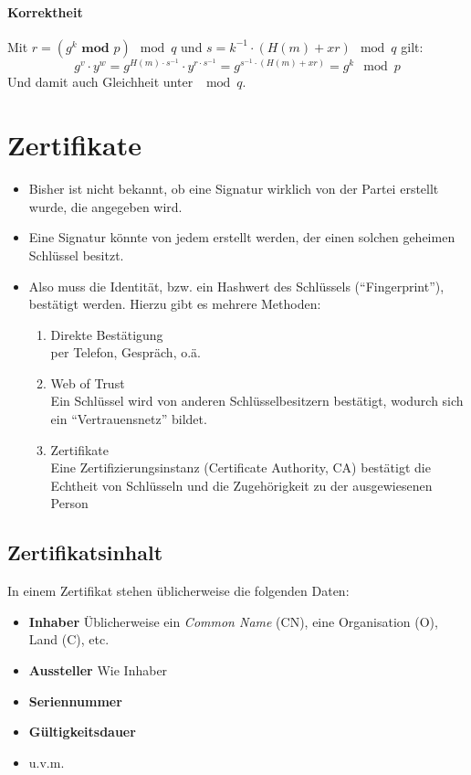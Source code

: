 \documentclass[a4paper, 11pt, accentcolor = tud3b]{tudreport}
\begin{document}
				\paragraph{Korrektheit}
					Mit \( r = (g ^ k \textbf{ mod } p) \mod q \) und \( s = k^{-1} \cdot (H(m) + xr) \mod q \) gilt:
					\begin{equation*}
						g^v \cdot y^w = g^{H(m) \cdot s^{-1}} \cdot y ^ { r \cdot s^{-1} } = g ^ { s^{-1} \cdot (H(m) + xr)} = g^k \mod p
					\end{equation*}
					Und damit auch Gleichheit unter \( \mod q \).

        \section{Zertifikate}
            \begin{itemize}
            	\item Bisher ist nicht bekannt, ob eine Signatur wirklich von der Partei erstellt wurde, die angegeben wird.
            	\item Eine Signatur könnte von jedem erstellt werden, der einen solchen geheimen Schlüssel besitzt.
            	\item Also muss die Identität, bzw. ein Hashwert des Schlüssels (\enquote{Fingerprint}), bestätigt werden. Hierzu gibt es mehrere Methoden:
	            	\begin{enumerate}
	            		\item Direkte Bestätigung \\ per Telefon, Gespräch, o.ä.
	            		\item Web of Trust \\ Ein Schlüssel wird von anderen Schlüsselbesitzern bestätigt, wodurch sich ein \enquote{Vertrauensnetz} bildet.
	            		\item Zertifikate \\ Eine Zertifizierungsinstanz (Certificate Authority, CA) bestätigt die Echtheit von Schlüsseln und die Zugehörigkeit zu der ausgewiesenen Person
	            	\end{enumerate}
            \end{itemize}

            \subsection{Zertifikatsinhalt}
			    In einem Zertifikat stehen üblicherweise die folgenden Daten:
			    \begin{itemize}
			    	\item \textbf{Inhaber} \tabto{3.5cm} Üblicherweise ein \textit{Common Name} (CN), eine Organisation (O), Land (C), etc.
			    	\item \textbf{Aussteller} \tabto{3.5cm} Wie Inhaber
			    	\item \textbf{Seriennummer}
			    	\item \textbf{Gültigkeitsdauer}
			    	\item u.v.m.
			    \end{itemize}
\end{document}

